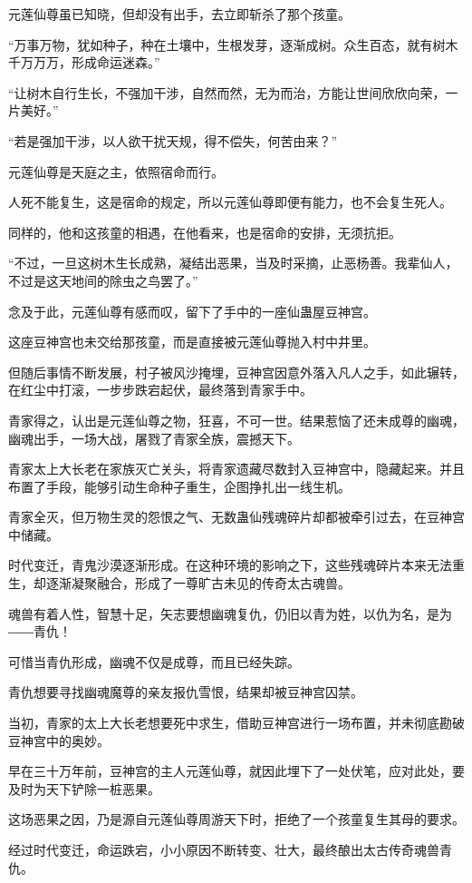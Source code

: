 \begin{this_body}
元莲仙尊虽已知晓，但却没有出手，去立即斩杀了那个孩童。

“万事万物，犹如种子，种在土壤中，生根发芽，逐渐成树。众生百态，就有树木千万万万，形成命运迷森。”

“让树木自行生长，不强加干涉，自然而然，无为而治，方能让世间欣欣向荣，一片美好。”

“若是强加干涉，以人欲干扰天规，得不偿失，何苦由来？”

元莲仙尊是天庭之主，依照宿命而行。

人死不能复生，这是宿命的规定，所以元莲仙尊即便有能力，也不会复生死人。

同样的，他和这孩童的相遇，在他看来，也是宿命的安排，无须抗拒。

“不过，一旦这树木生长成熟，凝结出恶果，当及时采摘，止恶杨善。我辈仙人，不过是这天地间的除虫之鸟罢了。”

念及于此，元莲仙尊有感而叹，留下了手中的一座仙蛊屋豆神宫。

这座豆神宫也未交给那孩童，而是直接被元莲仙尊抛入村中井里。

但随后事情不断发展，村子被风沙掩埋，豆神宫因意外落入凡人之手，如此辗转，在红尘中打滚，一步步跌宕起伏，最终落到青家手中。

青家得之，认出是元莲仙尊之物，狂喜，不可一世。结果惹恼了还未成尊的幽魂，幽魂出手，一场大战，屠戮了青家全族，震撼天下。

青家太上大长老在家族灭亡关头，将青家遗藏尽数封入豆神宫中，隐藏起来。并且布置了手段，能够引动生命种子重生，企图挣扎出一线生机。

青家全灭，但万物生灵的怨恨之气、无数蛊仙残魂碎片却都被牵引过去，在豆神宫中储藏。

时代变迁，青鬼沙漠逐渐形成。在这种环境的影响之下，这些残魂碎片本来无法重生，却逐渐凝聚融合，形成了一尊旷古未见的传奇太古魂兽。

魂兽有着人性，智慧十足，矢志要想幽魂复仇，仍旧以青为姓，以仇为名，是为――青仇！

可惜当青仇形成，幽魂不仅是成尊，而且已经失踪。

青仇想要寻找幽魂魔尊的亲友报仇雪恨，结果却被豆神宫囚禁。

当初，青家的太上大长老想要死中求生，借助豆神宫进行一场布置，并未彻底勘破豆神宫中的奥妙。

早在三十万年前，豆神宫的主人元莲仙尊，就因此埋下了一处伏笔，应对此处，要及时为天下铲除一桩恶果。

这场恶果之因，乃是源自元莲仙尊周游天下时，拒绝了一个孩童复生其母的要求。

经过时代变迁，命运跌宕，小小原因不断转变、壮大，最终酿出太古传奇魂兽青仇。


\end{this_body}
